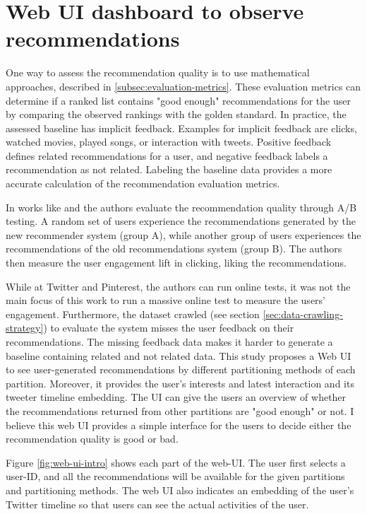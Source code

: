 \section{Web UI dashboard to observe recommendations}
\label{sec:web-ui}
One way to assess the recommendation quality is to use mathematical approaches, described in \ref{subsec:evaluation-metrics}. These evaluation metrics can determine if a ranked list contains "good enough" recommendations for the user by comparing the observed rankings with the golden standard. In practice, the assessed baseline has implicit feedback. Examples for implicit feedback are clicks, watched movies, played songs, or interaction with tweets. Positive feedback defines related recommendations for a user, and negative feedback labels a recommendation as not related. Labeling the baseline data provides a more accurate calculation of the recommendation evaluation metrics.


In works like \cite{eksombatchaiPixieSystemRecommending2018} and \cite{goelWhoToFollowSystemTwitter2015} the authors evaluate the recommendation quality through A/B testing. A random set of users experience the recommendations generated by the new recommender system (group A), while another group of users experiences the recommendations of the old recommendations system (group B). The authors then measure the user engagement lift in clicking, liking the recommendations. 


While at Twitter and Pinterest, the authors can run online tests, it was not the main focus of this work to run a massive online test to measure the users' engagement. Furthermore, the dataset crawled (see section \ref{sec:data-crawling-strategy}) to evaluate the system misses the user feedback on their recommendations. The missing feedback data makes it harder to generate a baseline containing related and not related data. This study proposes a Web UI to see user-generated recommendations by different partitioning methods of each partition. Moreover, it provides the user's interests and latest interaction and its tweeter timeline embedding. The UI can give the users an overview of whether the recommendations returned from other partitions are "good enough" or not. I believe this web UI provides a simple interface for the users to decide either the recommendation quality is good or bad.


Figure \ref{fig:web-ui-intro} shows each part of the web-UI. The user first selects a user-ID, and all the recommendations will be available for the given partitions and partitioning methods. The web UI also indicates an embedding of the user's Twitter timeline so that users can see the actual activities of the user. 


